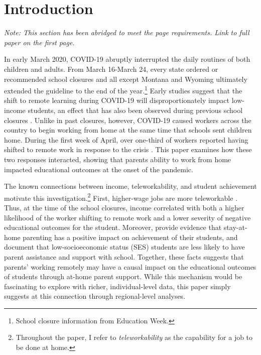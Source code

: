\section{Introduction} \label{sec:introduction}
\if{}
{\small
    \textit{Note: This section has been abridged to meet the page requirements. Link to full paper on the first page.}
}
\fi

In early March 2020, COVID-19 abruptly interrupted the daily routines of both children and adults.
From March 16-March 24, every state ordered or recommended school closures and
all except Montana and Wyoming ultimately extended the guideline to the end of the
year.\footnote{School closure information from Education Week.}
Early studies suggest that the shift to remote learning during COVID-19 will disproportionately impact low-income students,
an effect that has also been observed during previous school closures
\citep{vonHippel, horowitz, jaeger, malkus}.
Unlike in past closures, however, COVID-19 caused workers across the country to begin working from home
at the same time that schools sent children home.
During the first week of April, over one-third of workers reported having shifted
to remote work in response to the crisis \citep{bynjolfsson}.
This paper examines how these two responses interacted, showing that parents
ability to work from home impacted educational outcomes at the onset of the pandemic.

The known connections between income, teleworkability, and student achievement motivate this investigation.\footnote{Throughout the paper, I refer to \textit{teleworkability} as the capability for a job to be done at home.}
First, higher-wage jobs are more teleworkable
\citep{bartik, dingel}.
Thus, at the time of the school closures, income
correlated with both a higher likelihood of the worker shifting to remote work and a lower severity of negative educational outcomes for the student.
Moreover, \cite{bettinger} provide evidence that stay-at-home parenting has a positive impact on achievement of their students,
and \cite{sonnemann} document that low-socioeconomic status (SES) students are less likely to have parent assistance and support with school.
Together, these facts suggests that parents’ working remotely may have a causal impact on the educational outcomes of students through at-home parent support.
While this mechanism would be fascinating to explore with richer, individual-level data,
this paper simply suggests at this connection through regional-level analyses.

